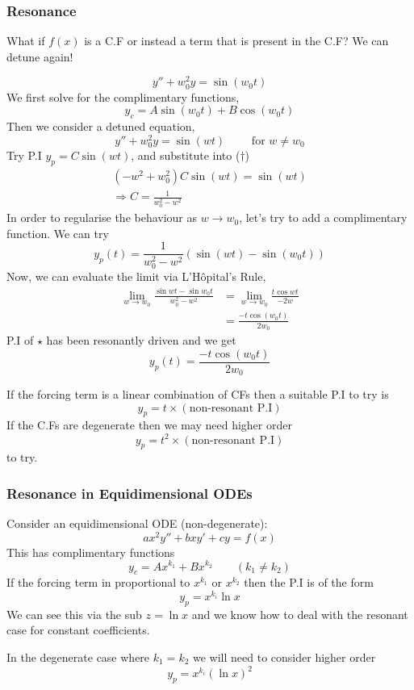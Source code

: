 \documentclass{article}
\begin{document}
\subsubsection*{Resonance}
What if $f(x)$ is a C.F or instead a term that is present in the C.F?
We can detune again!
\begin{eg}
    \[
        y'' + w_0^2 y = \sin (w_0 t)  
    \]
    We first solve for the complimentary functions,
    \[
        y_c = A \sin (w_0 t) + B \cos (w_0 t) \tag{$\star$}  
    \]
    Then we consider a detuned equation,
    \[
        y'' + w_0^2 y = \sin (wt) \qquad \text{ for } w \neq w_0\tag{$\dagger$}  
    \]
    Try P.I $y_p = C \sin (wt)$, and substitute into ($\dagger$)
    \begin{align*}
        (-w^2 + w_0^2) C \sin (wt) = \sin (wt) \\
        \Rightarrow C = \frac{1}{w_0^2 -w^2}
    \end{align*}
    In order to regularise the behaviour as $w \rightarrow w_0$, 
    let's try to add a complimentary function. We can try
    \[
        y_p (t) = \frac{1}{w_0^2 -w^2} (\sin (wt) - \sin (w_0t))
    \]
    Now, we can evaluate the limit via L'H\^opital's Rule,
    \begin{align*}
        \lim_{w \rightarrow w_0} \frac{\sin wt - \sin w_0 t}{w_0^2 -w^2} &= \lim_{w \rightarrow w_0} \frac{t \cos wt}{-2w} \\
        &= \frac{-t \cos (w_0t)}{2 w_0}
    \end{align*}
    P.I of $\star$ has been resonantly driven and we get
    \[
        y_p(t) = \frac{-t \cos (w_0t)}{2 w_0}
    \]
\end{eg}

\begin{remark}
    If the forcing term is a linear combination of CFs then a suitable P.I to try is
    \[
        y_p = t \times (\text{non-resonant P.I})  
    \]
    If the C.Fs are degenerate then we may need higher order 
    \[
        y_p = t^2 \times (\text{non-resonant P.I})  
    \]
    to try.
\end{remark}
\subsubsection*{Resonance in Equidimensional ODEs}
Consider an equidimensional ODE (non-degenerate):
\[
    a x^2 y'' + bxy' + cy = f(x)
\]
This has complimentary functions
\[
    y_c = A x^{k_1} + B x^{k_2} \qquad (k_1 \neq k_2)
\]
If the forcing term in proportional to $x^{k_1}$ or $x^{k_2}$ then the P.I is of the form
\[
    y_p = x^{k_i} \ln x  
\]
We can see this via the sub $z = \ln x$ and we know how to deal with the resonant case for constant coefficients.
\begin{remark}
    In the degenerate case where $k_1 = k_2$ we will need to consider higher order
    \[
        y_p = x^{k_i}(\ln x )^2
    \]
\end{remark}
\end{document}
